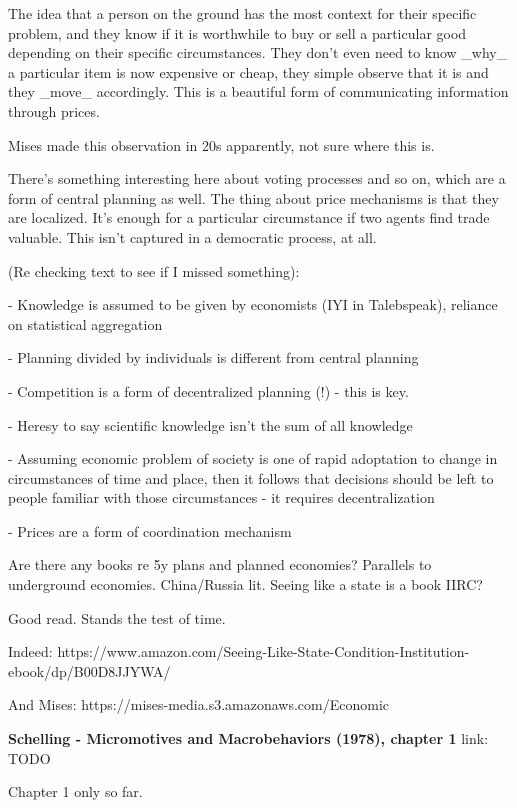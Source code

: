 \documentclass[12pt]{report}
\begin{document}
The idea that a person on the ground has the most context for their specific
problem, and they know if it is worthwhile to buy or sell a particular good
depending on their specific circumstances. They don't even need to know _why_ a
particular item is now expensive or cheap, they simple observe that it is and
they _move_ accordingly. This is a beautiful form of communicating information
through prices.

Mises made this observation in 20s apparently, not sure where this is.

There's something interesting here about voting processes and so on, which are a
form of central planning as well. The thing about price mechanisms is that they
are localized. It's enough for a particular circumstance if two agents find trade valuable. This isn't captured in a democratic process, at all.

(Re checking text to see if I missed something):

- Knowledge is assumed to be given by economists (IYI in Talebspeak), reliance on statistical aggregation

- Planning divided by individuals is different from central planning

- Competition is a form of decentralized planning (!) - this is key.

- Heresy to say scientific knowledge isn't the sum of all knowledge

- Assuming economic problem of society is one of rapid adoptation to change in circumstances of time and place, then it follows that decisions should be left to people familiar with those circumstances - it requires decentralization

- Prices are a form of coordination mechanism

Are there any books re 5y plans and planned economies? Parallels to underground economies. China/Russia lit. Seeing like a state is a book IIRC?

Good read. Stands the test of time.

Indeed: https://www.amazon.com/Seeing-Like-State-Condition-Institution-ebook/dp/B00D8JJYWA/

And Mises: https://mises-media.s3.amazonaws.com/Economic%

\textbf{Schelling - Micromotives and Macrobehaviors (1978), chapter 1}
link: TODO

Chapter 1 only so far.
\end{document}
